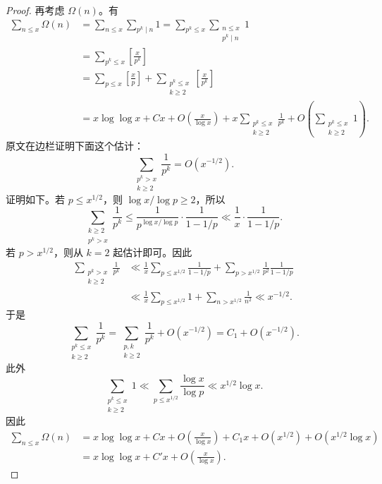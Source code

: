 \begin{proof}
	再考虑 $\Omega(n)$。有
	\[
	\begin{aligned}
		\sum_{n\leq x}\Omega(n)
		&=
		\sum_{n\leq x}\sum_{p^k\mid n}1
		=
		\sum_{p^k\leq x}\sum_{\substack{n\leq x\\ p^k\mid n}}1 \\
		&=
		\sum_{p^k\leq x}\left[\frac{x}{p^k}\right] \\
		&=
		\sum_{p\leq x}\left[\frac xp\right]
		+
		\sum_{\substack{p^k\leq x\\ k\geq 2}}
		\left[\frac{x}{p^k}\right] \\
		&=
		x\log\log x+Cx+O\left(\frac{x}{\log x}\right)
		+
		x\sum_{\substack{p^k\leq x\\ k\geq 2}}\frac1{p^k}
		+
		O\left(\sum_{\substack{p^k\leq x\\ k\geq 2}}1\right).
	\end{aligned}
	\]
	原文在边栏证明下面这个估计：
	\[
		\sum_{\substack{p^k>x\\ k\geq 2}}\frac1{p^k}
		=
		O\left(x^{-1/2}\right).
	\]
	证明如下。若 $p\leq x^{1/2}$，则 $\log x/\log p\geq 2$，所以
	\[
		\sum_{\substack{k\geq 2\\ p^k>x}}\frac1{p^k}
		\leq
		\frac{1}{p^{\log x/\log p}}\cdot\frac1{1-1/p}
		\ll
		\frac1x\cdot\frac1{1-1/p}.
	\]
	若 $p>x^{1/2}$，则从 $k=2$ 起估计即可。因此
	\[
	\begin{aligned}
		\sum_{\substack{p^k>x\\ k\geq 2}}\frac1{p^k}
		&\ll
		\frac1x\sum_{p\leq x^{1/2}}\frac1{1-1/p}
		+
		\sum_{p>x^{1/2}}\frac1{p^2}\frac1{1-1/p} \\
		&\ll
		\frac1x\sum_{p\leq x^{1/2}}1
		+
		\sum_{n>x^{1/2}}\frac1{n^2}
		\ll
		x^{-1/2}.
	\end{aligned}
	\]
	于是
	\[
		\sum_{\substack{p^k\leq x\\ k\geq 2}}\frac1{p^k}
		=
		\sum_{\substack{p,k\\ k\geq 2}}\frac1{p^k}
		+
		O\left(x^{-1/2}\right)
		=
		C_1+O\left(x^{-1/2}\right).
	\]
	此外
	\[
		\sum_{\substack{p^k\leq x\\ k\geq 2}}1
		\ll
		\sum_{p\leq x^{1/2}}\frac{\log x}{\log p}
		\ll
		x^{1/2}\log x.
	\]
	因此
	\[
	\begin{aligned}
		\sum_{n\leq x}\Omega(n)
		&=
		x\log\log x+Cx+O\left(\frac{x}{\log x}\right)
		+
		C_1x+O\left(x^{1/2}\right)
		+
		O\left(x^{1/2}\log x\right) \\
		&=
		x\log\log x+C'x+O\left(\frac{x}{\log x}\right).
	\end{aligned}
	\]
\end{proof}

